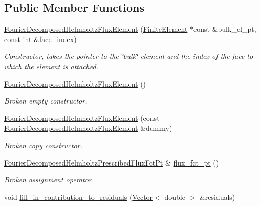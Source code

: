 \subsection*{Public Member Functions}
\begin{DoxyCompactItemize}
\item 
\hyperlink{classoomph_1_1FourierDecomposedHelmholtzFluxElement_a1b6b52935f6608ce7e4802e578dabd8f}{Fourier\+Decomposed\+Helmholtz\+Flux\+Element} (\hyperlink{classoomph_1_1FiniteElement}{Finite\+Element} $\ast$const \&bulk\+\_\+el\+\_\+pt, const int \&\hyperlink{classoomph_1_1FaceElement_a478d577ac6db67ecc80f1f02ae3ab170}{face\+\_\+index})
\begin{DoxyCompactList}\small\item\em Constructor, takes the pointer to the \char`\"{}bulk\char`\"{} element and the index of the face to which the element is attached. \end{DoxyCompactList}\item 
\hyperlink{classoomph_1_1FourierDecomposedHelmholtzFluxElement_a1fe214ab48deafae7c645c442a1c246d}{Fourier\+Decomposed\+Helmholtz\+Flux\+Element} ()
\begin{DoxyCompactList}\small\item\em Broken empty constructor. \end{DoxyCompactList}\item 
\hyperlink{classoomph_1_1FourierDecomposedHelmholtzFluxElement_a99d9d227f9336069444cacce81ffe467}{Fourier\+Decomposed\+Helmholtz\+Flux\+Element} (const \hyperlink{classoomph_1_1FourierDecomposedHelmholtzFluxElement}{Fourier\+Decomposed\+Helmholtz\+Flux\+Element} \&dummy)
\begin{DoxyCompactList}\small\item\em Broken copy constructor. \end{DoxyCompactList}\item 
\hyperlink{classoomph_1_1FourierDecomposedHelmholtzFluxElement_af230a2a3a16a1fd0a48a2681dc94c1e8}{Fourier\+Decomposed\+Helmholtz\+Prescribed\+Flux\+Fct\+Pt} \& \hyperlink{classoomph_1_1FourierDecomposedHelmholtzFluxElement_aa1c688db1894035d70064dc9df74cdc8}{flux\+\_\+fct\+\_\+pt} ()
\begin{DoxyCompactList}\small\item\em Broken assignment operator. \end{DoxyCompactList}\item 
void \hyperlink{classoomph_1_1FourierDecomposedHelmholtzFluxElement_ab1f6a456d20b3d6105c595dded3a621a}{fill\+\_\+in\+\_\+contribution\+\_\+to\+\_\+residuals} (\hyperlink{classoomph_1_1Vector}{Vector}$<$ double $>$ \&residuals)

\end{DoxyCompactItemize}
